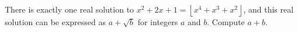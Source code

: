 There is exactly one real solution to $x^2+2x+1=\left\lfloor x^4+x^3+x^2\right\rfloor$, and this real solution can be expressed as $a+\sqrt{b}$ for integers $a$ and $b$. Compute $a+b$.

